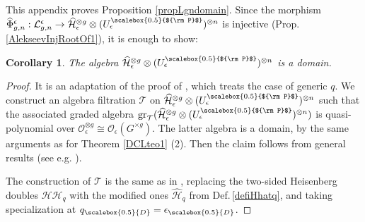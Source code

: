 \documentclass[11pt]{amsart}
\newtheorem{cor}[teo]{Corollary}
\newcommand{\e}{\epsilon}
\newcommand{\Oo}{\mathcal{O}}
\newcommand{\Tt}{\mathcal{T}}
\newcommand{\qD}{q_{\scalebox{0.5}{D}}}
\newcommand{\eD}{\epsilon_{\scalebox{0.5}{D}}}
\newcommand{\Pup}{{\scalebox{0.5}{${\rm P}$}}}
\begin{document}
This appendix proves Proposition \ref{propLgndomain}. Since the morphism $\widehat{\Phi}_{g,n}^{\e} :  \mathcal{L}_{g,n}^{\e} \to \widehat{\mathcal{H}}_{\e}^{\otimes g} \otimes (U_\e^\Pup)^{\otimes n}$ is injective (Prop.\,\ref{AlekseevInjRootOf1}), it is enough to show:
\begin{cor}\label{HUemaxorder} The algebra $\widehat{\mathcal{H}}_{\e}^{\otimes g} \otimes (U_\e^\Pup)^{\otimes n}$ is a domain.
\end{cor}
\begin{proof} It is an adaptation of the proof of \cite[Prop.\,5.7]{BFR}, which treats the case of generic $q$. We construct an algebra filtration $\Tt$ on $\widehat{\mathcal{H}}_{\e}^{\otimes g} \otimes (U_\e^\Pup)^{\otimes n}$ such that the associated graded algebra $\mathrm{gr}_{\Tt}(\widehat{\mathcal{H}}_{\e}^{\otimes g} \otimes (U_\e^\Pup)^{\otimes n})$ is quasi-polynomial over $\Oo_\e^{\otimes g}\cong \Oo_\e(G^{\times g})$. The latter algebra is a domain, by the same arguments as for Theorem \ref{DCLteo1} (2). Then  the claim follows from general results (see e.g. \cite[\S 1.2.9]{MC-R}). 

The construction of $\Tt$ is the same as in \cite[Prop.\,5.7]{BFR}, replacing the two-sided Heisenberg doubles $\mathcal{HH}_q$ with the modified ones $\widehat{\mathcal{H}}_{q}$ from Def.\,\ref{defiHhatq}, and taking specialization at $\qD=\eD$.


\end{proof}
\end{document}
